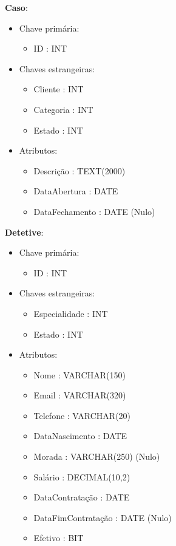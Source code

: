 \documentclass[a4paper,12pt]{scrreprt}
\begin{document}
        \textbf{Caso}:
        \begin{itemize}
            \item Chave primária:
                \begin{itemize}
                    \item ID : INT
                \end{itemize}
            \item Chaves estrangeiras:
                \begin{itemize}
                    \item Cliente : INT
                    \item Categoria : INT
                    \item Estado : INT
                \end{itemize}
            \item Atributos:
                \begin{itemize}
                    \item Descrição : TEXT(2000)
                    \item DataAbertura : DATE
                    \item DataFechamento : DATE (Nulo)
                \end{itemize}
        \end{itemize}

        \clearpage

        \textbf{Detetive}:
        \begin{itemize}
            \item Chave primária:
                \begin{itemize}
                    \item ID : INT
                \end{itemize}
            \item Chaves estrangeiras:
                \begin{itemize}
                    \item Especialidade : INT
                    \item Estado : INT
                \end{itemize}
            \item Atributos:
                \begin{itemize}
                    \item Nome : VARCHAR(150)
                    \item Email : VARCHAR(320)
                    \item Telefone : VARCHAR(20)
                    \item DataNascimento : DATE
                    \item Morada : VARCHAR(250) (Nulo)
                    \item Salário : DECIMAL(10,2)
                    \item DataContratação : DATE
                    \item DataFimContratação : DATE (Nulo)
                    \item Efetivo : BIT
                \end{itemize}
        \end{itemize}
\end{document}
